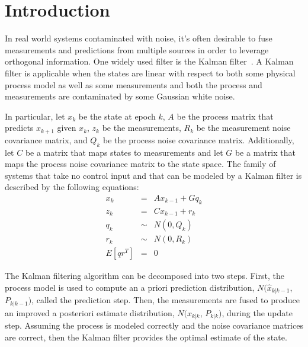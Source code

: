 \section{Introduction}\label{sec:intro}
In real world systems contaminated with noise, it's often desirable to fuse measurements and predictions from multiple sources in order to leverage orthogonal information.  One widely used filter is the Kalman filter~\cite{wiki:kalman}.  A Kalman filter is applicable when the states are linear with respect to both some physical process model as well as some measurements and both the process and measurements are contaminated by some Gaussian white noise.

In particular, let $x_k$ be the state at epoch $k$, $A$ be the process matrix that predicts $x_{k+1}$ given $x_k$, $z_k$ be the measurements, $R_k$ be the measurement noise covariance matrix, and $Q_k$ be the process noise covariance matrix.  Additionally, let $C$ be a matrix that maps states to measurements and let $G$ be a matrix that maps the process noise covariance matrix to the state space.  The family of systems that take no control input and that can be modeled by a Kalman filter is described by the following equations:\\
\begin{equation}
\begin{aligned}
x_{k} &=& A x_{k-1} + G q_{k}\\
z_{k} &=& C x_{k-1} + r_{k}\\
q_{k} &\sim& N(0, Q_k)\\
r_{k} &\sim& N(0, R_k)\\
E[qr^T] &=& 0
\end{aligned}
\end{equation}

The Kalman filtering algorithm can be decomposed into two steps.  First, the process model is used to compute an a priori prediction distribution, $N(\hat{x}_{k|k-1}$, $P_{k|k-1})$, called the prediction step.  Then, the measurements are fused to produce an improved a posteriori estimate distribution, $N(\hat{x}_{k|k}$, $P_{k|k})$, during the update step.  Assuming the process is modeled correctly and the noise covariance matrices are correct, then the Kalman filter provides the optimal estimate of the state.

